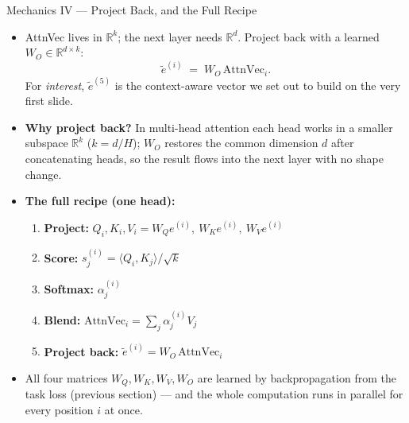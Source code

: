 \begin{frame}{Mechanics IV --- Project Back, and the Full Recipe}
\begin{itemize}
\item AttnVec lives in $\mathbb{R}^{k}$; the next layer needs $\mathbb{R}^{d}$. Project back with a learned $W_{O} \in \mathbb{R}^{d \times k}$:
\[
   \tilde{e}^{(i)} \;=\; W_{O}\,\text{AttnVec}_{i}.
\]
For \emph{interest}, $\tilde{e}^{(5)}$ is the context-aware vector we set out to build on the very first slide.

\medskip
\item \textbf{Why project back?} In multi-head attention each head works in a smaller subspace $\mathbb{R}^{k}$ ($k = d/H$); $W_O$ restores the common dimension $d$ after concatenating heads, so the result flows into the next layer with no shape change.

\medskip
\item \textbf{The full recipe (one head):}
\begin{enumerate}
    \item \textbf{Project:} $Q_i, K_i, V_i = W_Q e^{(i)},\ W_K e^{(i)},\ W_V e^{(i)}$
    \item \textbf{Score:} $s_{j}^{(i)} = \langle Q_i, K_j\rangle / \sqrt{k}$
    \item \textbf{Softmax:} $\alpha_{j}^{(i)}$
    \item \textbf{Blend:} $\text{AttnVec}_i = \sum_j \alpha_{j}^{(i)} V_j$
    \item \textbf{Project back:} $\tilde{e}^{(i)} = W_O\, \text{AttnVec}_i$
\end{enumerate}

\medskip
\item All four matrices $W_Q, W_K, W_V, W_O$ are learned by backpropagation from the task loss (previous section) --- and the whole computation runs in parallel for every position $i$ at once.
\end{itemize}
\end{frame}

